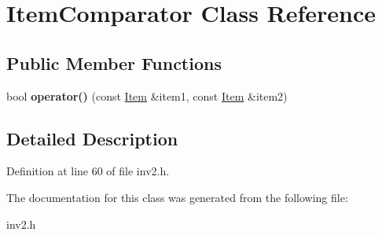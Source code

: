 \hypertarget{class_item_comparator}{}\section{Item\+Comparator Class Reference}
\label{class_item_comparator}
\subsection*{Public Member Functions}
\begin{DoxyCompactItemize}
\item 
\hypertarget{class_item_comparator_aed204fa45ce29576828361be79c016ec}{}\label{class_item_comparator_aed204fa45ce29576828361be79c016ec} 
bool {\bfseries operator()} (const \hyperlink{class_item}{Item} \&item1, const \hyperlink{class_item}{Item} \&item2)
\end{DoxyCompactItemize}


\subsection{Detailed Description}


Definition at line 60 of file inv2.\+h.



The documentation for this class was generated from the following file\+:\begin{DoxyCompactItemize}
\item 
inv2.\+h\end{DoxyCompactItemize}
